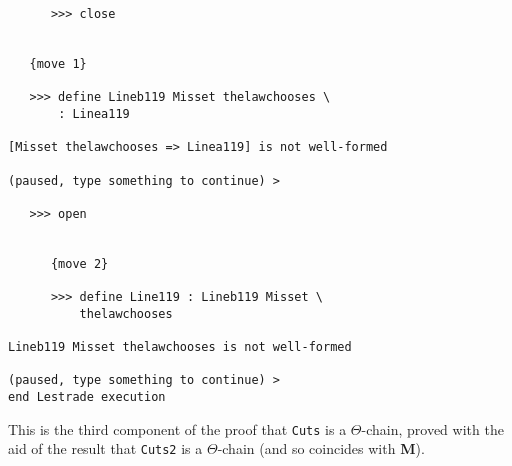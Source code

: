 \documentclass[12pt]{article}
\begin{document}
\begin{verbatim}
      >>> close


   {move 1}

   >>> define Lineb119 Misset thelawchooses \
       : Linea119

[Misset thelawchooses => Linea119] is not well-formed

(paused, type something to continue) >

   >>> open


      {move 2}

      >>> define Line119 : Lineb119 Misset \
          thelawchooses

Lineb119 Misset thelawchooses is not well-formed

(paused, type something to continue) >
end Lestrade execution
\end{verbatim}

This is the third component of the proof that {\tt Cuts} is a $\Theta$-chain, proved with the aid of the result that {\tt Cuts2} is a $\Theta$-chain (and so coincides with {\bf M}).
\end{document}
